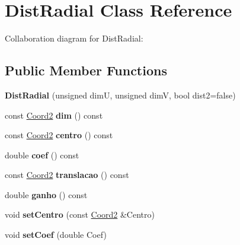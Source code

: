 \hypertarget{classDistRadial}{}\section{Dist\+Radial Class Reference}
\label{classDistRadial}


Collaboration diagram for Dist\+Radial\+:
\subsection*{Public Member Functions}
\begin{DoxyCompactItemize}
\item 
{\bfseries Dist\+Radial} (unsigned dimU, unsigned dimV, bool dist2=false)\hypertarget{classDistRadial_aafb80e63692b78ef2f48eee81adef1f9}{}\label{classDistRadial_aafb80e63692b78ef2f48eee81adef1f9}

\item 
const \hyperlink{structCoord2}{Coord2} {\bfseries dim} () const \hypertarget{classDistRadial_a4c7bcc195461efb03c2e18cf11ba1d54}{}\label{classDistRadial_a4c7bcc195461efb03c2e18cf11ba1d54}

\item 
const \hyperlink{structCoord2}{Coord2} {\bfseries centro} () const \hypertarget{classDistRadial_af7981fed358bcaab9a7055bb4d90e77d}{}\label{classDistRadial_af7981fed358bcaab9a7055bb4d90e77d}

\item 
double {\bfseries coef} () const \hypertarget{classDistRadial_a1a3c41b9abc49a3f951f6b7772103fed}{}\label{classDistRadial_a1a3c41b9abc49a3f951f6b7772103fed}

\item 
const \hyperlink{structCoord2}{Coord2} {\bfseries translacao} () const \hypertarget{classDistRadial_abe3d18c9af95d6627dcf8432d60bcebc}{}\label{classDistRadial_abe3d18c9af95d6627dcf8432d60bcebc}

\item 
double {\bfseries ganho} () const \hypertarget{classDistRadial_af66c53d9634440eb355215df31c25020}{}\label{classDistRadial_af66c53d9634440eb355215df31c25020}

\item 
void {\bfseries set\+Centro} (const \hyperlink{structCoord2}{Coord2} \&Centro)\hypertarget{classDistRadial_ac2cff52d7b0fbd1d5fe849e18426c548}{}\label{classDistRadial_ac2cff52d7b0fbd1d5fe849e18426c548}

\item 
void {\bfseries set\+Coef} (double Coef)\hypertarget{classDistRadial_aa7b596212024590448087b2fc2f8f286}{}\label{classDistRadial_aa7b596212024590448087b2fc2f8f286}


\end{DoxyCompactItemize}
